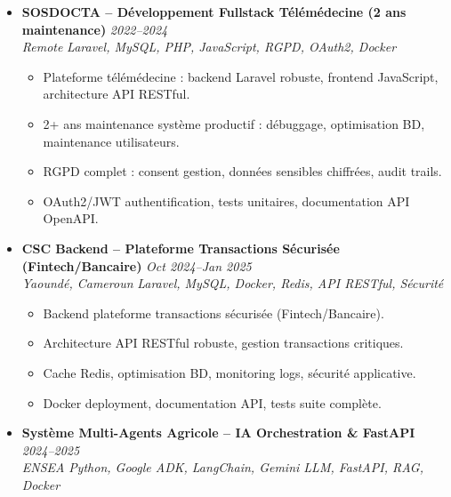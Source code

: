\documentclass[a4paper,11pt]{article}
\begin{document}
\begin{itemize}[leftmargin=*, label={-}]
    \item \textbf{SOSDOCTA -- Développement Fullstack Télémédecine (2 ans maintenance)} \hfill \textit{2022--2024} \\
    \textit{Remote} \hfill \textit{Laravel, MySQL, PHP, JavaScript, RGPD, OAuth2, Docker}
    \vspace{-2pt}
        \begin{itemize}[leftmargin=0.4cm, nosep, label=\tiny$\bullet$]
            \item \small{Plateforme télémédecine : backend Laravel robuste, frontend JavaScript, architecture API RESTful.}
            \item \small{2+ ans maintenance syst\`eme productif : débuggage, optimisation BD, maintenance utilisateurs.}
            \item \small{RGPD complet : consent gestion, données sensibles chiffr\'ees, audit trails.}
            \item \small{OAuth2/JWT authentification, tests unitaires, documentation API OpenAPI.}
        \end{itemize}
    \vspace{3pt}
    \item \textbf{CSC Backend -- Plateforme Transactions S\'ecuris\'ee (Fintech/Bancaire)} \hfill \textit{Oct 2024--Jan 2025} \\
    \textit{Yaound\'e, Cameroun} \hfill \textit{Laravel, MySQL, Docker, Redis, API RESTful, Sécurité}
    \vspace{-2pt}
        \begin{itemize}[leftmargin=0.4cm, nosep, label=\tiny$\bullet$]
            \item \small{Backend plateforme transactions sécurisée (Fintech/Bancaire).}
            \item \small{Architecture API RESTful robuste, gestion transactions critiques.}
            \item \small{Cache Redis, optimisation BD, monitoring logs, sécurité applicative.}
            \item \small{Docker deployment, documentation API, tests suite complète.}
        \end{itemize}
    \vspace{3pt}
    \item \textbf{Syst\`eme Multi-Agents Agricole -- IA Orchestration \& FastAPI} \hfill \textit{2024--2025} \\
    \textit{ENSEA} \hfill \textit{Python, Google ADK, LangChain, Gemini LLM, FastAPI, RAG, Docker}
    \vspace{-2pt}

\end{itemize}
\end{document}
